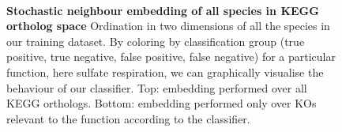 \documentclass[10pt,letterpaper]{article}
\begin{document}
\begin{figure}
\\
\caption{{\bf Stochastic neighbour embedding of all species in KEGG ortholog space}
Ordination in two dimensions of all the species in our training dataset. By coloring by classification group (true positive, true negative, false positive, false negative) for a particular function, here sulfate respiration, we can graphically visualise the behaviour of our classifier. Top: embedding performed over all KEGG orthologs. Bottom: embedding performed only over KOs relevant to the function according to the classifier.}
\label{tsne}
\end{figure}
\end{document}
